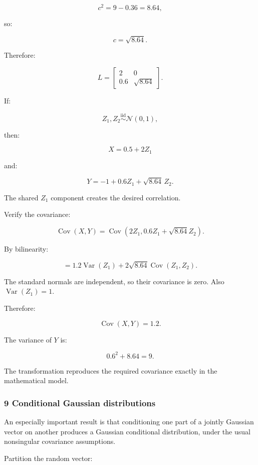 \[
 c^2=9-0.36=8.64,
\]

so:

\[
 c=\sqrt{8.64}.
\]

Therefore:

\[
 \boxed{ L= \begin{bmatrix} 2&0\\ 0.6&\sqrt{8.64} \end{bmatrix} }.
\]

If:

\[
 Z_1,Z_2\overset{\mathrm{iid}}{\sim}\mathcal N(0,1),
\]

then:

\[
 \boxed{ X=0.5+2Z_1 }
\]

and:

\[
 \boxed{ Y=-1+0.6Z_1+\sqrt{8.64}\,Z_2 }.
\]

The shared \(Z_1\) component creates the desired correlation.

Verify the covariance:

\[
 \operatorname{Cov}(X,Y) = \operatorname{Cov}(2Z_1,0.6Z_1+\sqrt{8.64}Z_2).
\]

By bilinearity:

\[
 = 1.2\operatorname{Var}(Z_1) + 2\sqrt{8.64}\operatorname{Cov}(Z_1,Z_2).
\]

The standard normals are independent, so their covariance is zero. Also \(\operatorname{Var}(Z_1)=1\).

Therefore:

\[
 \boxed{\operatorname{Cov}(X,Y)=1.2}.
\]

The variance of \(Y\) is:

\[
 0.6^2+8.64=9.
\]

The transformation reproduces the required covariance exactly in the mathematical model.

\subsubsection{9 Conditional Gaussian distributions}\label{02-foundations-ii-ch024-conditional-gaussian-distributions}

\hypertarget{02-foundations-ii-ch024-conditional-gaussian-distributions}{}

An especially important result is that conditioning one part of a jointly Gaussian vector on another produces a Gaussian conditional distribution, under the usual nonsingular covariance assumptions.

Partition the random vector:

